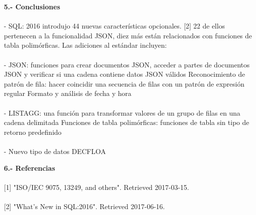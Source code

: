 \documentclass[preprint,12pt]{article}
\begin{document}
\begin{justify}
\textbf{5.- Conclusiones}  \\\\ 
 - SQL: 2016 introdujo 44 nuevas características opcionales. [2] 22 de ellos pertenecen a la funcionalidad JSON, diez más están relacionados con funciones de tabla polimórficas. Las adiciones al estándar incluyen:\\\\- JSON: funciones para crear documentos JSON, acceder a partes de documentos JSON y verificar si una cadena contiene datos JSON válidos
Reconocimiento de patrón de fila: hacer coincidir una secuencia de filas con un patrón de expresión regular
Formato y análisis de fecha y hora
\\\\- LISTAGG: una función para transformar valores de un grupo de filas en una cadena delimitada
Funciones de tabla polimórficas: funciones de tabla sin tipo de retorno predefinido
\\\\- Nuevo tipo de datos DECFLOA

\end{justify}


\begin{justify}
\textbf{6.- Referencias}  \\\\ 
 {[1] "ISO/IEC 9075, 13249, and others". Retrieved 2017-03-15.}\\\\
 {[2] "What's New in SQL:2016". Retrieved 2017-06-16.}
\end{justify}
\end{document}
